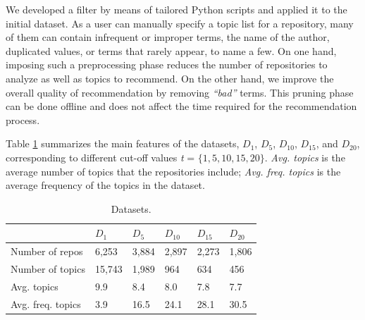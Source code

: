 We developed a filter by means of tailored Python scripts and 
applied it to the initial dataset. As a \GH user can manually specify a topic 
list for a repository, many of them can contain infrequent or improper terms, 
\ie the name 
of the author, duplicated values, or terms that rarely appear, to name a few. 
On one hand, imposing such a preprocessing phase reduces the number of 
repositories to analyze as well as topics to recommend. On the other hand, we 
improve the overall quality of recommendation by removing \emph{``bad''} terms. 
This pruning phase can be done offline and does not affect the time required 
for the recommendation process.



Table \ref{tab:Datasets} summarizes the main features of the datasets, \ie 
$D_1$, $D_5$, $D_{10}$, $D_{15}$, and $D_{20}$, corresponding to different cut-off values \emph{t} = $\{1, 5, 10, 15, 20\}$. \emph{Avg. topics} is the average number of topics that the 
repositories include; \emph{Avg. freq. topics} is the average frequency of the topics in the 
dataset.%


%


\begin{table}[h!]
	\caption{Datasets.}
	\begin{tabular}{|l|p{0.68cm}|p{0.68cm}|p{0.68cm}|p{0.68cm}|p{0.68cm}|} \hline
		 & $D_{1}$ & $D_{5}$ & $D_{10}$ & $D_{15}$ & $D_{20}$ \\ \hline
		Number of repos & 6,253 & 3,884 & 2,897  & 2,273 & 1,806  \\ \hline
		Number of topics & 15,743 & 1,989 & 964 & 634 & 456 \\ \hline
		Avg. topics & 9.9 & 8.4 & 8.0  & 7.8 & 7.7 \\ \hline
		Avg. freq. topics & 3.9  & 16.5  & 24.1  & 28.1  & 30.5  \\ \hline
	\end{tabular}	
	\label{tab:Datasets}	
\end{table}



